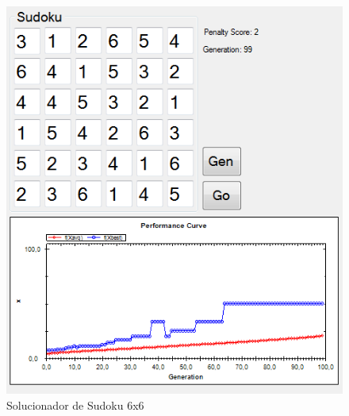 \documentclass[twoside]{article}
\begin{document}
\begin{multicols}{2}
\begin{figure}[H]
\label{fig:sudokusolver6x6}
  \caption{Solucionador de Sudoku 6x6}
  \centering
    \includegraphics[scale = 0.60]{Sudoku6x6.png}
\end{figure}



\end{multicols}
\end{document}
